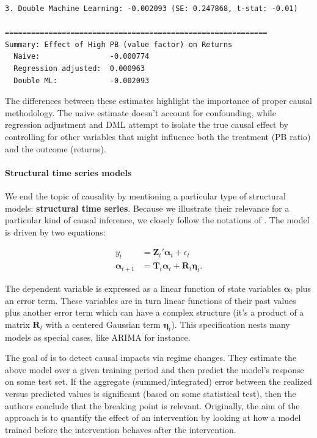 \begin{verbatim}
3. Double Machine Learning: -0.002093 (SE: 0.247868, t-stat: -0.01)

============================================================
Summary: Effect of High PB (value factor) on Returns
  Naive:                -0.000774
  Regression adjusted:  0.000963
  Double ML:            -0.002093
\end{verbatim}

The differences between these estimates highlight the importance of proper causal methodology. The naive estimate doesn't account for confounding, while regression adjustment and DML attempt to isolate the true causal effect by controlling for other variables that might influence both the treatment (PB ratio) and the outcome (returns).

\paragraph{Structural time series models}

We end the topic of causality by mentioning a particular type of structural models: \textbf{structural time series}. Because we illustrate their relevance for a particular kind of causal inference, we closely follow the notations of \cite{brodersen2015inferring}. The model is driven by two equations:

\begin{align*}
y_t&=\textbf{Z}_t'\boldsymbol{\alpha}_t+\epsilon_t \\
\boldsymbol{\alpha}_{t+1}& =\textbf{T}_t\boldsymbol{\alpha}_{t}+\textbf{R}_t\boldsymbol{\eta}_t.
\end{align*}

The dependent variable is expressed as a linear function of state variables $\boldsymbol{\alpha}_t$ plus an error term. These variables are in turn linear functions of their past values plus another error term which can have a complex structure (it's a product of a matrix $\textbf{R}_t$ with a centered Gaussian term $\boldsymbol{\eta}_t$). This specification nests many models as special cases, like ARIMA for instance.

The goal of \cite{brodersen2015inferring} is to detect causal impacts via regime changes. They estimate the above model over a given training period and then predict the model's response on some test set. If the aggregate (summed/integrated) error between the realized versus predicted values is significant (based on some statistical test), then the authors conclude that the breaking point is relevant. Originally, the aim of the approach is to quantify the effect of an intervention by looking at how a model trained before the intervention behaves after the intervention.

